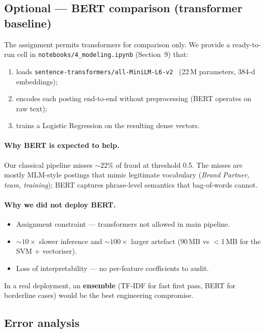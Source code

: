 \documentclass[11pt,a4paper]{article}
\newcommand{\code}[1]{\texttt{\small #1}}
\begin{document}
\subsection{Optional --- BERT comparison (transformer baseline)}

The assignment permits transformers for comparison only. We provide a
ready-to-run cell in \code{notebooks/4\_modeling.ipynb} (Section~9) that:

\begin{enumerate}
    \item loads \code{sentence-transformers/all-MiniLM-L6-v2}~\cite{sbert}
          (22\,M parameters, 384-d embeddings);
    \item encodes each posting end-to-end without preprocessing
          (BERT operates on raw text);
    \item trains a Logistic Regression on the resulting dense vectors.
\end{enumerate}

\paragraph{Why BERT is expected to help.} Our classical pipeline misses
${\sim}22\%$ of fraud at threshold 0.5. The misses are mostly MLM-style
postings that mimic legitimate vocabulary (\emph{Brand Partner, team,
training}); BERT captures phrase-level semantics that bag-of-words cannot.

\paragraph{Why we did not deploy BERT.}
\begin{itemize}
    \item Assignment constraint --- transformers not allowed in main pipeline.
    \item ${\sim}10{\times}$ slower inference and ${\sim}100{\times}$ larger
          artefact (90\,MB vs $<$1\,MB for the SVM + vectoriser).
    \item Loss of interpretability --- no per-feature coefficients to audit.
\end{itemize}

In a real deployment, an \textbf{ensemble} (TF-IDF for fast first pass, BERT
for borderline cases) would be the best engineering compromise.

\subsection{Error analysis}
\end{document}
